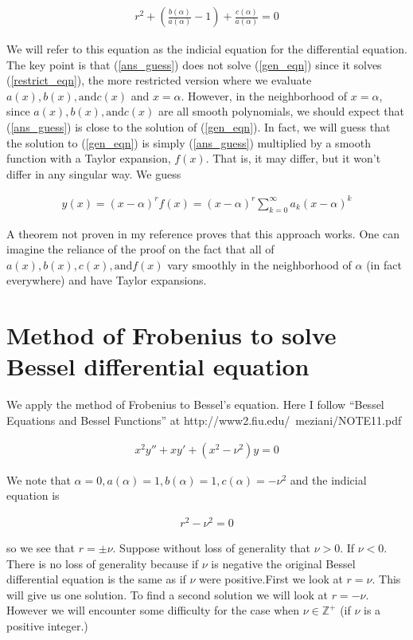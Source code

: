 \documentclass[12pt]{article}
\begin{document}
\begin{align}
r^2 + \left(\frac{b(\alpha)}{a(\alpha)} - 1\right) + \frac{c(\alpha)}{a(\alpha)} = 0
\end{align}

We will refer to this equation as the indicial equation for the differential equation. The key point is that (\ref{ans_guess}) does not solve (\ref{gen_eqn}) since it solves (\ref{restrict_eqn}), the more restricted version where we evaluate $a(x), b(x), \text{and} c(x)$ and $x=\alpha$. However, in the neighborhood of $x=\alpha$, since $a(x), b(x), \text{and} c(x)$ are all smooth polynomials, we should expect that (\ref{ans_guess}) is close to the solution of (\ref{gen_eqn}). In fact, we will guess that the solution to (\ref{gen_eqn}) is simply (\ref{ans_guess}) multiplied by a smooth function with a Taylor expansion, $f(x)$. That is, it may differ, but it won't differ in any singular way. We guess

\begin{align}
y(x) = (x-\alpha)^r f(x)  = (x-\alpha)^r \sum_{k=0}^{\infty} a_k (x-\alpha)^k
\end{align}

A theorem not proven in my reference proves that this approach works. One can imagine the reliance of the proof on the fact that all of $a(x), b(x), c(x), \text{and} f(x)$ vary smoothly in the neighborhood of $\alpha$ (in fact everywhere) and have Taylor expansions.

\section{Method of Frobenius to solve Bessel differential equation}

We apply the method of Frobenius to Bessel's equation. Here I follow ``Bessel Equations and Bessel Functions'' at http://www2.fiu.edu/~meziani/NOTE11.pdf

\begin{align}
x^2 y'' + x y' + (x^2-\nu^2)y = 0
\end{align}

We note that $\alpha = 0, a(\alpha) = 1, b(\alpha) = 1, c(\alpha) = -\nu^2$ and the indicial equation is

\begin{align}
r^2 - \nu^2 = 0
\end{align}

so we see that $r = \pm \nu$. Suppose without loss of generality that $\nu >0$. If $\nu<0$. There is no loss of generality because if $\nu$ is negative the original Bessel differential equation is the same as if $\nu$ were positive.First we look at $r = \nu$. This will give us one solution. To find a second solution we will look at $r = -\nu$. However we will encounter some difficulty for the case when $\nu \in \mathbb{Z}^+$ (if $\nu$ is a positive integer.)
\end{document}
